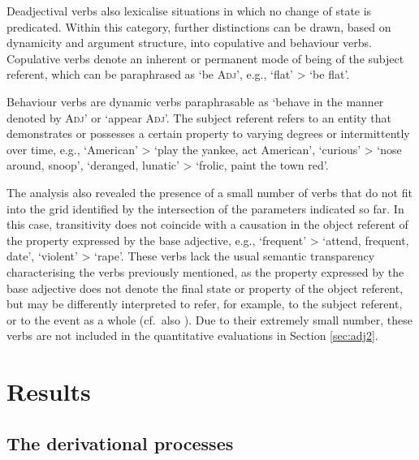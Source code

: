 \documentclass[output=paper,colorlinks,citecolor=brown]{langscibook}
\begin{document}
Deadjectival verbs  also lexicalise situations in which no change of state  is predicated. Within this category, further distinctions can be drawn, based on dynamicity and argument structure, into copulative and behaviour verbs. Copulative verbs denote an inherent or permanent mode of being of the subject referent, which can be paraphrased as ‘be \textsc{Adj}’, e.g.,  ‘flat’ >  ‘be flat’.

Behaviour verbs are dynamic verbs paraphrasable as ‘behave in the manner denoted by \textsc{Adj}’ or ‘appear \textsc{Adj}’. The subject referent refers to an entity that demonstrates or possesses a certain property to varying degrees or intermittently over time, e.g., 
 ‘American’ >   ‘play the yankee, act American’,  ‘curious’ >  ‘nose around, snoop’,  ‘deranged, lunatic’ >  ‘frolic, paint the town red’.

The analysis also revealed the presence of a small number of verbs that do not fit into the grid identified by the intersection of the parameters indicated so far. In this case, transitivity does not coincide with a causation in the object referent of the property expressed by the base adjective, e.g.,  ‘frequent’ >  ‘attend, frequent, date’,  ‘violent’ >  ‘rape’. These verbs lack the usual semantic transparency characterising the  verbs previously mentioned, as the property expressed by the base adjective does not denote the final state or property of the object referent, but may be differently interpreted to refer, for example, to the subject referent, or to the event as a whole (cf.\ also \citealt[108--112]{Fabregas2023}). Due to their extremely small number, these verbs are not included in the quantitative evaluations in Section \ref{sec:adj2}.

\section{Results}\label{sec:results}
 \subsection{The derivational processes}\label{sec:processes}
\end{document}
